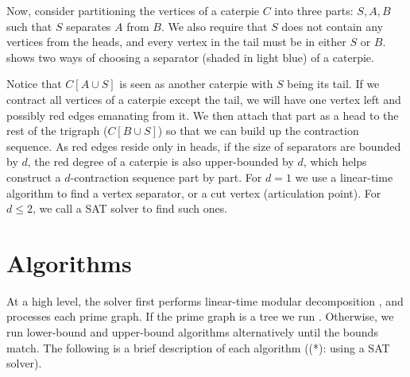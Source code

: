 \documentclass[a4paper,UKenglish,cleveref, autoref, thm-restate]{lipics-v2021}
\begin{document}
Now, consider partitioning the vertices of a caterpie $C$ into three parts:
$S, A, B$ such that $S$ separates $A$ from $B$.
%
We also require that $S$ does not contain any vertices from the heads,
and every vertex in the tail must be in either $S$ or $B$.
%
 shows two ways of choosing a separator (shaded in light blue)
of a caterpie.

Notice that $C[A \cup S]$ is seen as another caterpie with $S$ being its tail.
If we contract all vertices of a caterpie except the tail,
we will have one vertex left and possibly red edges emanating from it.
%
We then attach that part as a head to the rest of the trigraph ($C[B \cup S]$)
so that we can build up the contraction sequence.
%
As red edges reside only in heads,
if the size of separators are bounded by $d$,
the red degree of a caterpie is also upper-bounded by $d$,
which helps construct a $d$-contraction sequence part by part.
%
For $d=1$ we use a linear-time algorithm to find a vertex separator,
or a cut vertex (articulation point).
For $d \leq 2$, we call a SAT solver to find such ones.

\section{Algorithms}

At a high level, the solver first performs linear-time modular decomposition \cite{tedder_simple_2008},
and processes each prime graph.
%
If the prime graph is a tree
we run \primetreesolver.
%
Otherwise, we run lower-bound and upper-bound algorithms alternatively
until the bounds match.
%
The following is a brief description of each algorithm ((*): using a SAT solver).
\end{document}

